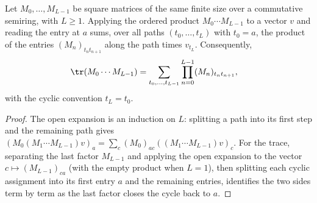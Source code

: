 \begin{lemma}%
    \label{lem:matrix_cyclic_path_sum}
    \leanok
    Let $M_0,\ldots,M_{L-1}$ be square matrices of the same finite size over a
    commutative semiring, with $L\ge1$. Applying the ordered product
    $M_0\cdots M_{L-1}$ to a vector $v$ and reading the entry at $a$ sums,
    over all paths $(t_0,\ldots,t_L)$ with $t_0=a$, the product of the
    entries $(M_n)_{t_n t_{n+1}}$ along the path times $v_{t_L}$.
    Consequently,
    \begin{align}
        \tr(M_0\cdots M_{L-1})
         & =\sum_{t_0,\ldots,t_{L-1}}\prod_{n=0}^{L-1}(M_n)_{t_n t_{n+1}},
        \notag
    \end{align}
    with the cyclic convention $t_L=t_0$.
\end{lemma}
\begin{proof}\leanok
    The open expansion is an induction on $L$: splitting a path into its first
    step and the remaining path gives
    $(M_0(M_1\cdots M_{L-1})v)_a
        =\sum_c(M_0)_{ac}((M_1\cdots M_{L-1})v)_c$.
    For the trace, separating the last factor $M_{L-1}$ and applying the open
    expansion to the vector $c\mapsto(M_{L-1})_{ca}$ (with the empty
    product when $L=1$), then splitting each cyclic assignment into its first
    entry $a$ and the remaining entries, identifies the two sides term by term
    as the last factor closes the cycle back to $a$.
\end{proof}

